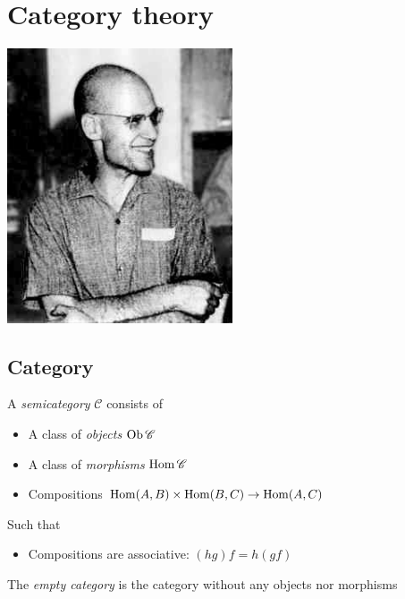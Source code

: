 \documentclass[main]{subfiles}
\begin{document}
\chapter{Category theory}

\begin{center}
\includegraphics[width=0.5\textwidth]{MyMathematicalUniverse/Pictures/Alexander_Grothendieck.jpg}
\end{center}
\newpage

\tableofcontents
\newpage

\section{Category}

\begin{definition}
A \textit{semicategory} $\mathscr C$ consists of
\begin{itemize}
\item A class of \textit{objects} $\operatorname{Ob}\mathscr C$
\item A class of \textit{morphisms} $\operatorname{Hom}\mathscr C$
\item Compositions $\operatorname{Hom}(A,B)\times\operatorname{Hom}(B,C)\to\operatorname{Hom}(A,C)$
\end{itemize}
Such that
\begin{itemize}
\item Compositions are associative: $(hg)f=h(gf)$
\end{itemize}
\end{definition}

\begin{definition}
The \textit{empty category} is the category without any objects nor morphisms
\end{definition}
\end{document}
